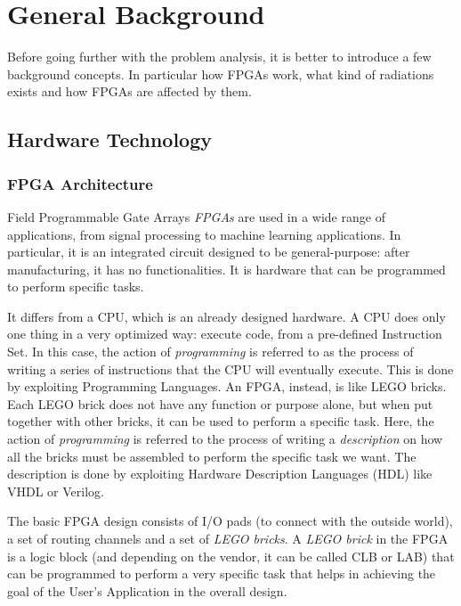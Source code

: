 \nocite{doi:10.1063/1.5127719}
\nocite{STERPONE20152087}
\nocite{1545891}
\nocite{7948546}
\nocite{8093203}
\nocite{ecss1}

\chapter{General Background}
\label{sec:background}

Before going further with the problem analysis, it is better to introduce a few background concepts. In particular how FPGAs work, what kind of radiations exists and how FPGAs are affected by them.  

\section{Hardware Technology}

\subsection{FPGA Architecture}
\label{sec:fpgaarchitecture}
Field Programmable Gate Arrays \textit{FPGAs} are used in a wide range of applications, from signal processing to machine learning applications. In particular, it is an integrated circuit designed to be general-purpose: after manufacturing, it has no functionalities. It is hardware that can be programmed to perform specific tasks. \bigskip

It differs from a CPU, which is an already designed hardware. A CPU does only one thing in a very optimized way: execute code, from a pre-defined Instruction Set. In this case, the action of \textit{programming} is referred to as the process of writing a series of instructions that the CPU will eventually execute. This is done by exploiting Programming Languages. An FPGA, instead, is like LEGO bricks. Each LEGO brick does not have any function or purpose alone, but when put together with other bricks, it can be used to perform a specific task. Here, the action of \textit{programming} is referred to the process of writing a \textit{description} on how all the bricks must be assembled to perform the specific task we want. The description is done by exploiting Hardware Description Languages (HDL) like VHDL or Verilog. \bigskip

The basic FPGA design consists of I/O pads (to connect with the outside world), a set of routing channels and a set of \textit{LEGO bricks}. A \textit{LEGO brick} in the FPGA is a logic block (and depending on the vendor, it can be called CLB or LAB) that can be programmed to perform a very specific task that helps in achieving the goal of the User's Application in the overall design. 

